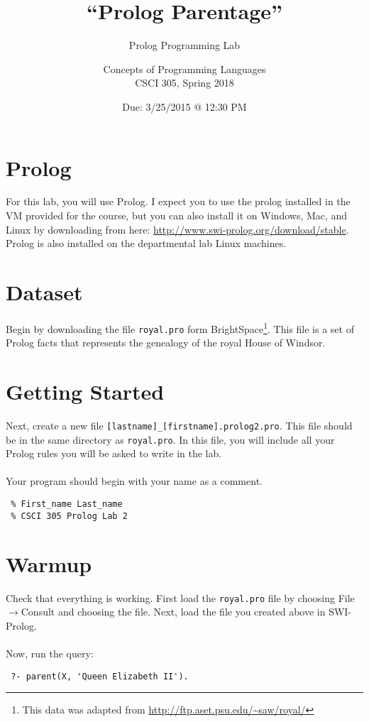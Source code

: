 \documentclass{article}
\title{``Prolog Parentage''}
\subtitle{Prolog Programming Lab}
\author{Concepts of Programming Languages\\CSCI 305, Spring 2018}
\date{Due: 3/25/2015 @ 12:30 PM}
\begin{document}
\maketitle

\section*{Prolog}
For this lab, you will use Prolog. I expect you to use the prolog installed in the VM provided for the course, but you can also install it on Windows, Mac, and Linux by downloading from here: \url{http://www.swi-prolog.org/download/stable}. Prolog is also installed on the departmental lab Linux machines.

\section*{Dataset}
Begin by downloading the file \verb|royal.pro| form BrightSpace\footnote{This data was adapted from \url{http://ftp.aset.psu.edu/~saw/royal/}}. This file is a set of Prolog facts that represents the genealogy of the royal House of Windsor.

\section*{Getting Started}
Next, create a new file \verb|[lastname]_[firstname].prolog2.pro|. This file should be in the same directory as \verb|royal.pro|. In this file, you will include all your Prolog rules you will be asked to write in the lab.
\\\\
Your program should begin with your name as a comment.
\begin{lstlisting}
 % First_name Last_name
 % CSCI 305 Prolog Lab 2
\end{lstlisting}

\section*{Warmup}
Check that everything is working. First load the \verb|royal.pro| file by choosing File$\rightarrow$Consult and choosing the file. Next, load the file you created above in SWI-Prolog.
\\\\
\noindent Now, run the query:

\begin{lstlisting}
 ?- parent(X, 'Queen Elizabeth II').
\end{lstlisting}
\end{document}
